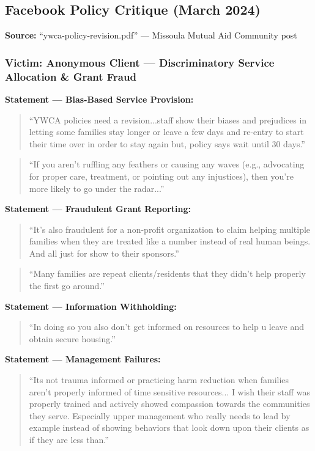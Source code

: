 \documentclass[11pt,letterpaper]{article}
\newenvironment{testimony}{%
    \begin{quote}\itshape\color{DarkGray}%
}{%
    \end{quote}%
}
\begin{document}
\subsection{Facebook Policy Critique (March 2024)}

\textbf{Source:} ``ywca-policy-revision.pdf'' --- Missoula Mutual Aid Community post

\subsubsection{Victim: Anonymous Client --- Discriminatory Service Allocation \& Grant Fraud}

\textbf{Statement --- Bias-Based Service Provision:}
\begin{testimony}
``YWCA policies need a revision...staff show their biases and prejudices in letting some families stay longer or leave a few days and re-entry to start their time over in order to stay again but, policy says wait until 30 days.''
\end{testimony}

\begin{testimony}
``If you aren't ruffling any feathers or causing any waves (e.g., advocating for proper care, treatment, or pointing out any injustices), then you're more likely to go under the radar...''
\end{testimony}

\textbf{Statement --- Fraudulent Grant Reporting:}
\begin{testimony}
``It's also fraudulent for a non-profit organization to claim helping multiple families when they are treated like a number instead of real human beings. And all just for show to their sponsors.''
\end{testimony}

\begin{testimony}
``Many families are repeat clients/residents that they didn't help properly the first go around.''
\end{testimony}

\textbf{Statement --- Information Withholding:}
\begin{testimony}
``In doing so you also don't get informed on resources to help u leave and obtain secure housing.''
\end{testimony}

\textbf{Statement --- Management Failures:}
\begin{testimony}
``Its not trauma informed or practicing harm reduction when families aren't properly informed of time sensitive resources... I wish their staff was properly trained and actively showed compassion towards the communities they serve. Especially upper management who really needs to lead by example instead of showing behaviors that look down upon their clients as if they are less than.''
\end{testimony}
\end{document}
